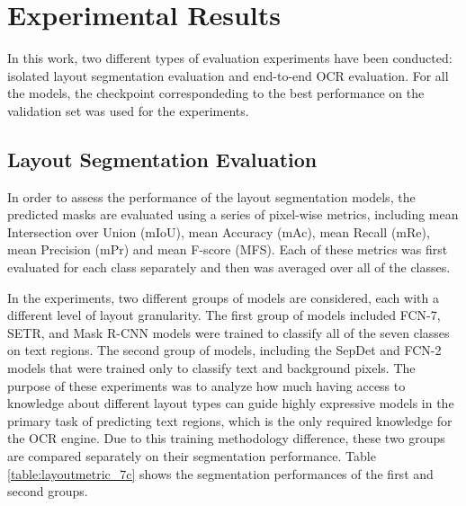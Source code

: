\documentclass[letterpaper]{article} %
\begin{document}
\section{Experimental Results}
In this work, two different types of evaluation experiments have been conducted: isolated layout segmentation evaluation and end-to-end OCR evaluation. For all the models, the checkpoint correspondeding to the best performance on the validation set was used for the experiments.
\subsection{Layout Segmentation Evaluation}

In order to assess the performance of the layout segmentation models, the predicted masks are evaluated using a series of pixel-wise metrics, including mean Intersection over Union (mIoU), mean Accuracy (mAc), mean Recall (mRe), mean Precision (mPr) and mean F-score (MFS). Each of these metrics was first evaluated for each class separately and then was averaged over all of the classes.

In the experiments, two different groups of models are considered, each with a different level of layout granularity. The first group of models included FCN-7, SETR, and Mask R-CNN models were trained to classify all of the seven classes on text regions. The second group of models, including the SepDet and FCN-2 models that were trained only to classify text and background pixels. The purpose of these experiments was to analyze how much having access to knowledge about different layout types can guide highly expressive models in the primary task of predicting text regions, which is the only required knowledge for the OCR engine. Due to this training methodology difference, these two groups are compared separately on their segmentation performance. Table  \ref{table:layoutmetric_7c}  
shows the segmentation performances of the first and second groups.
\end{document}
